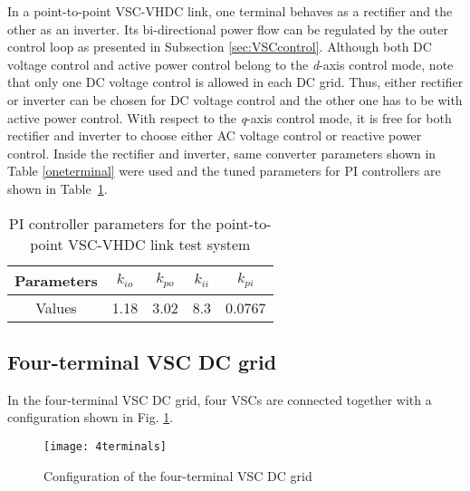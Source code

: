 \documentclass[conference]{IEEEtran}
\begin{document}
In a point-to-point VSC-VHDC link, one terminal behaves as a rectifier and the other as an inverter. Its bi-directional power flow can be regulated by the outer control loop as presented in Subsection \ref{sec:VSCcontrol}. Although both DC voltage control and active power control belong to the \emph{d}-axis control mode, note that only one DC voltage control is allowed in each DC grid. Thus, either rectifier or inverter can be chosen for DC voltage control and the other one has to be with active power control. With respect to the \emph{q}-axis control mode, it is free for both rectifier and inverter to choose either AC voltage control or reactive power control. Inside the rectifier and inverter, same converter parameters shown in Table \ref{oneterminal} were used and the tuned parameters for PI controllers are shown in Table~\ref{twoterminalsPI}.
\begin{table}[!ht]
\centering
\caption{PI controller parameters for the point-to-point VSC-VHDC link test system}
\begin{tabular}{| c | c | c | c | c | }
\hline
Parameters & $k_{io}$ & $k_{po}$ & $k_{ii}$ & $k_{pi}$ \\\hline
Values & 1.18 & 3.02 & 8.3 & 0.0767\\\hline
\end{tabular}
\label{twoterminalsPI}
\end{table}
\subsection{Four-terminal VSC DC grid}
In the four-terminal VSC DC grid, four VSCs are connected together with a configuration shown in Fig. \ref{4terminals}. 
\begin{figure}[h]
\centering
\texttt{[image: 4terminals]}
\caption{Configuration of the four-terminal VSC DC grid}
\label{4terminals}
\end{figure}
\end{document}
